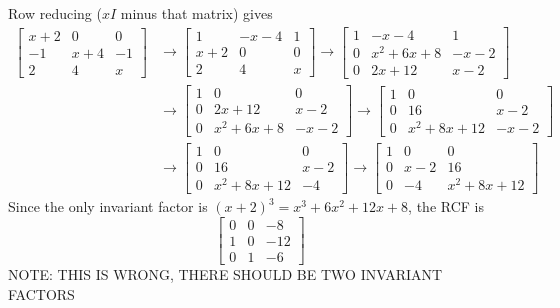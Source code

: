 \documentclass[12pt]{article}
\begin{document}
\section{}
\noindent{}\bigskip\par
Row reducing ($xI$ minus that matrix) gives
\begin{align*}
    \begin{bmatrix}
        x+2 & 0 & 0 \\
        -1 & x+4 & -1 \\
        2 & 4 & x
        \end{bmatrix} &\rightarrow \begin{bmatrix}
        1 & -x-4 & 1 \\
        x+2 & 0 & 0 \\
        2 & 4 & x
    \end{bmatrix} \rightarrow \begin{bmatrix}
        1 & -x-4 & 1 \\
        0 & x^2+6x+8 & -x-2 \\
        0 & 2x+12 & x-2
    \end{bmatrix}\\
    & \rightarrow \begin{bmatrix}
        1 & 0 & 0 \\
        0 & 2x+12 & x-2 \\
        0 & x^2+6x+8 & -x-2
    \end{bmatrix} \rightarrow \begin{bmatrix}
        1 & 0 & 0 \\
        0 & 16 & x-2 \\
        0 & x^2 + 8x + 12 & -x-2
    \end{bmatrix} \\
    & \rightarrow \begin{bmatrix}
        1 & 0 & 0 \\
        0 & 16 & x-2 \\
        0 & x^2+8x+12 & -4
    \end{bmatrix} \rightarrow \begin{bmatrix}
        1 & 0 & 0 \\
        0 & x-2 & 16 \\
        0 & -4 & x^2+8x+12
    \end{bmatrix}
\end{align*}
Since the only invariant factor is $(x+2)^3=x^3+6x^2+12x+8$, the RCF is
\[ \begin{bmatrix}
    0 & 0 & -8 \\
    1 & 0 & -12 \\
    0 & 1 & -6
\end{bmatrix} \]
NOTE: THIS IS WRONG, THERE SHOULD BE TWO INVARIANT FACTORS
\end{document}
